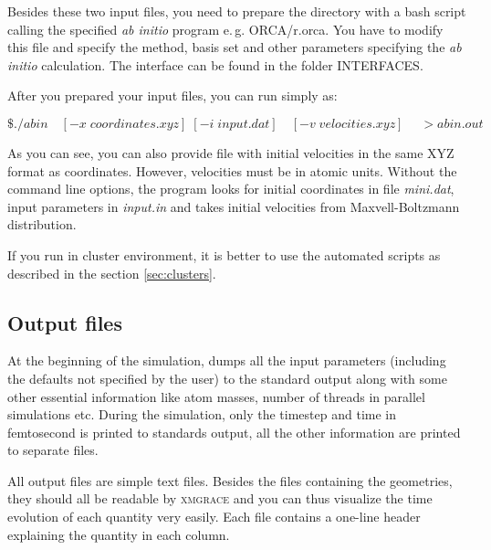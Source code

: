 Besides these two input files, you need to prepare the directory with a bash script calling the specified \textit{ab initio} program e.\,g. ORCA/r.orca. You have to modify this file and specify the method, basis set and other parameters specifying the \textit{ab initio} calculation. The interface can be found in the folder INTERFACES.

After you prepared your input files, you can run \abin simply as:

\bigskip
\noindent \colorbox{black!20}{$ \$ ./abin \quad [-x \; coordinates.xyz]\; [-i\; input.dat]\quad [-v \; velocities.xyz]\; \quad > abin.out $}

\bigskip \noindent
As you can see, you can also provide file with initial velocities in the same XYZ format as coordinates. However, velocities must be in atomic units. Without the command line options, the program looks for initial coordinates in file \textit{mini.dat}, input parameters in \textit{input.in} and takes initial velocities from Maxvell-Boltzmann distribution.

If you run \abin in cluster environment, it is better to use the automated scripts as described in the section \ref{sec:clusters}.

\subsection{Output files}

At the beginning of the simulation, \abin dumps all the input parameters (including the defaults not specified by the user)
to the standard output along with some other essential information like atom masses, number of threads in parallel simulations etc.
During the simulation, only the timestep and time in femtosecond is printed to standards output, all the other information are printed to separate files.

All output files are simple text files. Besides the files containing the geometries, they should all be readable by \textsc{xmgrace} and you can thus visualize the time evolution of each quantity very easily. Each file contains a one-line header explaining the quantity in each column.

